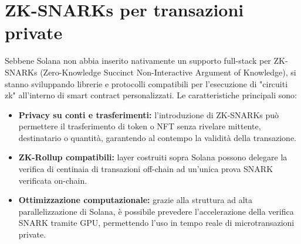 \documentclass[a4paper,12pt]{report}
\begin{document}
	\section{ZK-SNARKs per transazioni private}
	Sebbene Solana non abbia inserito nativamente un supporto full-stack per ZK-SNARKs (Zero-Knowledge Succinct Non-Interactive Argument of Knowledge), si stanno sviluppando librerie e protocolli compatibili per l’esecuzione di "circuiti zk" all’interno di smart contract personalizzati. Le caratteristiche principali sono:
	\begin{itemize}
		\item \textbf{Privacy su conti e trasferimenti:} l’introduzione di ZK-SNARKs può permettere il trasferimento di token o NFT senza rivelare mittente, destinatario o quantità, garantendo al contempo la validità della transazione.
		\item \textbf{ZK-Rollup compatibili:} layer costruiti sopra Solana possono delegare la verifica di centinaia di transazioni off-chain ad un’unica prova SNARK verificata on-chain.
		\item \textbf{Ottimizzazione computazionale:} grazie alla struttura ad alta parallelizzazione di Solana, è possibile prevedere l’accelerazione della verifica SNARK tramite GPU, permettendo l’uso in tempo reale di microtransazioni private.
	\end{itemize}
	
\end{document}
